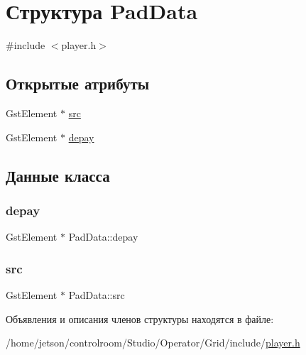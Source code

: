 \hypertarget{struct_pad_data}{}\section{Структура Pad\+Data}
\label{struct_pad_data}


{\ttfamily \#include $<$player.\+h$>$}

\subsection*{Открытые атрибуты}
\begin{DoxyCompactItemize}
\item 
Gst\+Element $\ast$ \hyperlink{struct_pad_data_a2dcc36381541106e5f4d2a8eba93c743}{src}
\item 
Gst\+Element $\ast$ \hyperlink{struct_pad_data_acd71290a8ca04825f41627151fd4caa3}{depay}
\end{DoxyCompactItemize}


\subsection{Данные класса}
\mbox{\label{struct_pad_data_acd71290a8ca04825f41627151fd4caa3}} 
\subsubsection{\texorpdfstring{depay}{depay}}
{\footnotesize\ttfamily Gst\+Element $\ast$ Pad\+Data\+::depay}

\mbox{\label{struct_pad_data_a2dcc36381541106e5f4d2a8eba93c743}} 
\subsubsection{\texorpdfstring{src}{src}}
{\footnotesize\ttfamily Gst\+Element $\ast$ Pad\+Data\+::src}



Объявления и описания членов структуры находятся в файле\+:\begin{DoxyCompactItemize}
\item 
/home/jetson/controlroom/\+Studio/\+Operator/\+Grid/include/\hyperlink{_operator_2_grid_2include_2player_8h}{player.\+h}\end{DoxyCompactItemize}
